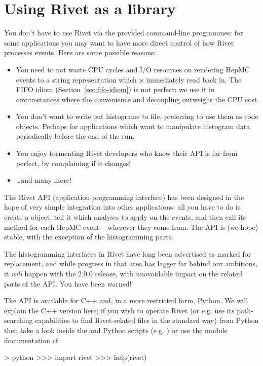 \section{Using Rivet as a library}

You don't have to use Rivet via the provided command-line programmes: for some
applications you may want to have more direct control of how Rivet processes
events. Here are some possible reasons:
%
\begin{itemize}
\item You need to not waste CPU cycles and I/O resources on rendering HepMC
  events to a string representation which is immediately read back in. The FIFO
  idiom (Section~\ref{sec:fifo-idiom}) is not perfect: we use it in circumstances
  where the convenience and decoupling outweighs the CPU cost.
\item You don't want to write out histograms to file, preferring to use them as
  code objects. Perhaps for applications which want to manipulate histogram data
  periodically before the end of the run.
\item You enjoy tormenting Rivet developers who know their API is far from
  perfect, by complaining if it changes!
\item \dots and many more!
\end{itemize}

The Rivet API (application programming interface) has been designed in the hope
of very simple integration into other applications: all you have to do is create
a  object, tell it which analyses to apply on the
events, and then call its  method for each HepMC event --
wherever they come from. The API is (we hope) stable, with the exception of the
histogramming parts.

\begin{warning}
  The histogramming interfaces in Rivet have long been advertised as marked for
  replacement, and while progress in that area has lagger far behind our
  ambitions, it \emph{will} happen with the 2.0.0 release, with unavoidable
  impact on the related parts of the API. You have been warned!
\end{warning}

The API is available for C++ and, in a more restricted form, Python. We will
explain the C++ version here; if you wish to operate Rivet (or e.g. use its
path-searching capabilities to find Rivet-related files in the standard way)
from Python then take a look inside the  and  Python
scripts (e.g. ) or use the module documentation cf.
%
\begin{snippet}
> python
>>> import rivet
>>> help(rivet)
\end{snippet}

